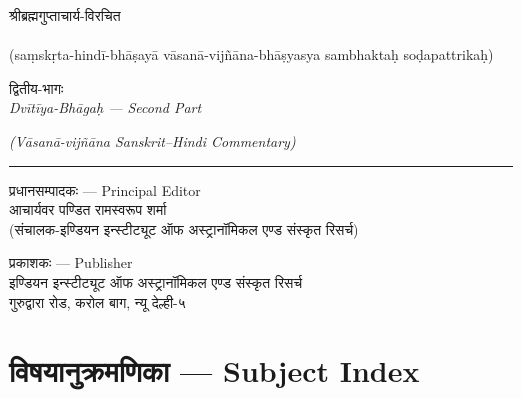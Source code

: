 \documentclass[11pt,a4paper]{article}
\newcommand{\longline}{\noindent\rule{\textwidth}{0.4pt}}
\newcommand{\dev}[1]{{\devanagarifont #1}}
\newcommand{\devbold}[1]{{\devanagarifontbold #1}}
\begin{document}
\thispagestyle{empty}
\begin{center}
\vspace*{2cm}

{\dev{श्रीब्रह्मगुप्ताचार्य-विरचित}}\\[0.5cm]
{\fontsize{24}{28}\selectfont\devbold{ब्राह्मस्फुटसिद्धान्तः}}\\[0.5cm]
{\large (\textsanskrit{saṃskṛta-hindī-bhāṣayā vāsanā-vijñāna-bhāṣyasya sambhaktaḥ soḍapattrikaḥ})}

\vspace{2cm}

{\LARGE\devbold{द्वितीय-भागः}}\\[0.4cm]
{\Large\textit{Dvītīya-Bhāgaḥ --- Second Part}}

\vspace{0.4cm}
{\large\textit{(Vāsanā-vijñāna Sanskrit--Hindi Commentary)}}

\vspace{2.5cm}

\longline

\vspace{1cm}

{\normalsize\dev{प्रधानसम्पादकः --- Principal Editor}}\\[0.3cm]
{\large\devbold{आचार्यवर पण्डित रामस्वरूप शर्मा}}\\[0.2cm]
{\small (\dev{संचालक-इण्डियन इन्स्टीट्यूट ऑफ अस्ट्रानॉमिकल एण्ड संस्कृत रिसर्च})}

\vspace{1.5cm}

{\normalsize\dev{प्रकाशकः --- Publisher}}\\[0.2cm]
{\dev{इण्डियन इन्स्टीट्यूट ऑफ अस्ट्रानॉमिकल एण्ड संस्कृत रिसर्च}}\\
{\dev{गुरुद्वारा रोड, करोल बाग, न्यू देल्ही-५}}

\end{center}
\newpage

\section*{\dev{विषयानुक्रमणिका} — Subject Index}
\end{document}

